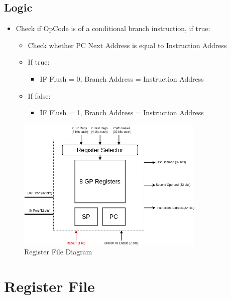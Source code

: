 \documentclass[12pt]{report}
\begin{document}
\subsection{Logic}
\begin{itemize}
    \item Check if OpCode is of a conditional branch instruction, if true:
    \begin{itemize}
        \item Check whether PC Next Address is equal to Instruction Address
        \item If true:
        \begin{itemize}
            \item IF Flush = 0, Branch Address = Instruction Address
        \end{itemize}
        \item If false:
        \begin{itemize}
            \item IF Flush = 1, Branch Address = Instruction Address
        \end{itemize}
    \end{itemize}
\end{itemize}

\begin{center}
    \begin{figure}[hp]
        \centering
        \includegraphics[width=0.8\textwidth]{reg_file}
        \caption{Register File Diagram}
        \label{fig:reg_file}
    \end{figure}
\end{center}

\section{Register File}
\end{document}
